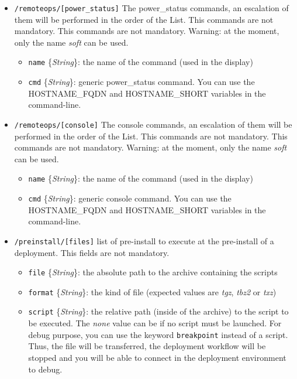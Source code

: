 \documentclass[a4wide,10pt,oneside]{book}
\newcommand{\ypath}[1]{\texttt{#1}}
\newcommand{\yfield}[2]{\texttt{#1} {\small\{{\emph{#2}}\}}:}
\begin{document}
\begin{itemize}
  \item \ypath{/remoteops/[power\_status]} The power\_status commands, an escalation of them will be performed in the order of the List. This commands are not mandatory. This commands are not mandatory. Warning: at the moment, only the name \emph{soft} can be used.
  \begin{itemize}
    \item \yfield{name}{String} the name of the command (used in the display)
    \item \yfield{cmd}{String} generic power\_status command. You can use the HOSTNAME\_FQDN and HOSTNAME\_SHORT variables in the command-line.
  \end{itemize}

  \item \ypath{/remoteops/[console]} The console commands, an escalation of them will be performed in the order of the List. This commands are not mandatory. This commands are not mandatory. Warning: at the moment, only the name \emph{soft} can be used.
  \begin{itemize}
    \item \yfield{name}{String} the name of the command (used in the display)
    \item \yfield{cmd}{String} generic console command. You can use the HOSTNAME\_FQDN and HOSTNAME\_SHORT variables in the command-line.
  \end{itemize}

  \item \ypath{/preinstall/[files]} list of pre-install to execute at the pre-install of a deployment. This fields are not mandatory. 
  \begin{itemize}
    \item \yfield{file}{String} the absolute path to the archive containing the scripts
    \item \yfield{format}{String} the kind of file (expected values are \emph{tgz}, \emph{tbz2} or \emph{txz})
    \item \yfield{script}{String} the relative path (inside of the archive) to the script to be executed. The \textit{none} value can be if no script must be launched. For debug purpose, you can use the keyword \texttt{breakpoint} instead of a script. Thus, the file will be transferred, the deployment workflow will be stopped and you will be able to connect in the deployment environment to debug.
  \end{itemize}


\end{itemize}
\end{document}
